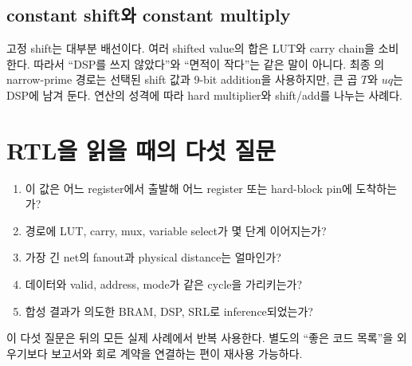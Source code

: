 \subsection{constant shift와 constant multiply}

고정 shift는 대부분 배선이다. 여러 shifted value의 합은 LUT와 carry chain을
소비한다. 따라서 ``DSP를 쓰지 않았다''와 ``면적이 작다''는 같은 말이 아니다.
최종 의 narrow-prime 경로는 선택된 shift 값과 9-bit
addition을 사용하지만, 큰 곱 $T$와 $u q$는 DSP에 남겨 둔다. 연산의 성격에
따라 hard multiplier와 shift/add를 나누는 사례다.

\section{RTL을 읽을 때의 다섯 질문}

\begin{checklistbox}
\begin{enumerate}
  \item 이 값은 어느 register에서 출발해 어느 register 또는 hard-block pin에 도착하는가?
  \item 경로에 LUT, carry, mux, variable select가 몇 단계 이어지는가?
  \item 가장 긴 net의 fanout과 physical distance는 얼마인가?
  \item 데이터와 valid, address, mode가 같은 cycle을 가리키는가?
  \item 합성 결과가 의도한 BRAM, DSP, SRL로 inference되었는가?
\end{enumerate}
\end{checklistbox}

이 다섯 질문은 뒤의 모든 실제 사례에서 반복 사용한다. 별도의 ``좋은 코드
목록''을 외우기보다 보고서와 회로 계약을 연결하는 편이 재사용 가능하다.
